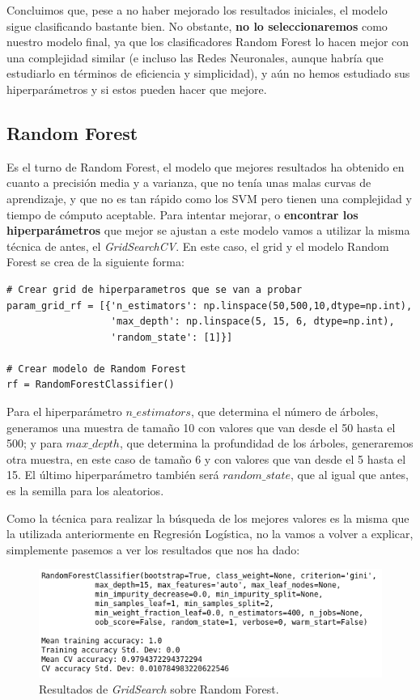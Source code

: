\documentclass[11pt,a4paper]{article}
\begin{document}
Concluimos que, pese a no haber mejorado los resultados iniciales, el modelo sigue clasificando bastante bien. No obstante, \textbf{no lo
seleccionaremos} como nuestro modelo final, ya que los clasificadores Random Forest lo hacen mejor con una complejidad similar (e incluso las
Redes Neuronales, aunque habría que estudiarlo en términos de eficiencia y simplicidad), y aún no hemos estudiado sus hiperparámetros y si
estos pueden hacer que mejore.

\subsection{Random Forest}

Es el turno de Random Forest, el modelo que mejores resultados ha obtenido en cuanto a precisión media y a varianza, que no tenía unas
malas curvas de aprendizaje, y que no es tan rápido como los SVM pero tienen una complejidad y tiempo de cómputo aceptable. Para intentar
mejorar, o \textbf{encontrar los hiperparámetros} que mejor se ajustan a este modelo vamos a utilizar la misma técnica de antes, el
\textit{GridSearchCV}. En este caso, el grid y el modelo Random Forest se crea de la siguiente forma:

\begin{lstlisting}
# Crear grid de hiperparametros que se van a probar
param_grid_rf = [{'n_estimators': np.linspace(50,500,10,dtype=np.int),
                  'max_depth': np.linspace(5, 15, 6, dtype=np.int),
                  'random_state': [1]}]

# Crear modelo de Random Forest
rf = RandomForestClassifier()

\end{lstlisting}

Para el hiperparámetro $n\_estimators$, que determina el número de árboles, generamos una muestra de tamaño 10 con valores que van desde el
50 hasta el 500; y para $max\_depth$, que determina la profundidad de los árboles, generaremos otra muestra, en este caso de tamaño 6 y con
valores que van desde el 5 hasta el 15. El último hiperparámetro también será $random\_state$, que al igual que antes, es la semilla para
los aleatorios.

Como la técnica para realizar la búsqueda de los mejores valores es la misma que la utilizada anteriormente en Regresión Logística, no la
vamos a volver a explicar, simplemente pasemos a ver los resultados que nos ha dado:

\begin{figure}[H]
    \centering
    \includegraphics[scale=0.6]{img/gs-rf.png}
    \caption{Resultados de \textit{GridSearch} sobre Random Forest.}
    \label{fig:gs-rf}
\end{figure}
\end{document}
